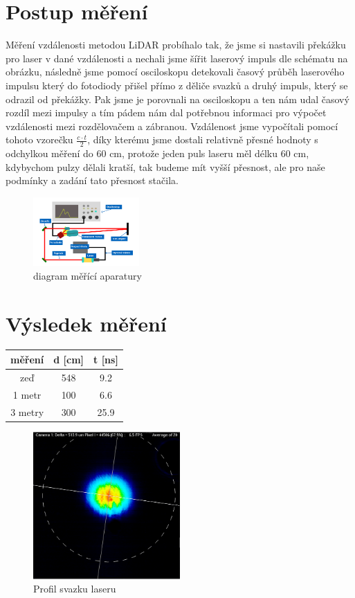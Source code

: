 \documentclass[12pt,a4paper]{article}
\begin{document}
\section{Postup měření}
Měření vzdálenosti metodou LiDAR probíhalo tak, že jsme si nastavili překážku pro laser v dané vzdálenosti a nechali jsme šířit laserový impuls dle schématu na obrázku, následně jsme pomocí osciloskopu detekovali časový průběh laserového impulsu který do fotodiody přišel přímo z děliče svazků a druhý impuls, který se odrazil od překážky. Pak jsme je porovnali na osciloskopu a ten nám udal časový rozdíl mezi impulsy a tím pádem nám dal potřebnou informaci pro výpočet vzdálenosti mezi rozdělovačem a zábranou. Vzdálenost jsme vypočítali pomocí tohoto vzorečku $\frac{c \cdot t}{2}$, díky kterému jsme dostali relativně přesné hodnoty s odchylkou měření do 60 cm, protože jeden puls laseru měl délku 60 cm, kdybychom pulzy dělali kratší, tak budeme mít vyšší přesnost, ale pro naše podmínky a zadání tato přesnost stačila.
\begin{figure}[h]
    \centering
    \includegraphics[width=0.36\textwidth]{Diagram měření.png}
    \caption{diagram měřící aparatury}
\end{figure}
\pagebreak
\section{Výsledek měření}

\begin{center}
    \begin{tabular}{||c c c||} 
     \hline
      měření & d [cm] & t [ns] \\ [0.5ex] 
     \hline\hline
     zeď & 548 & 9.2 \\ 
     \hline
     1 metr & 100 & 6.6 \\
     \hline
     3 metry & 300 & 25.9 \\
     \hline
    \end{tabular}
    \end{center}
    
\begin{figure}[h!]
    \centering
    \includegraphics[width=0.5\textwidth]{profil.png}
    \caption{Profil svazku laseru}
\end{figure}
\end{document}
